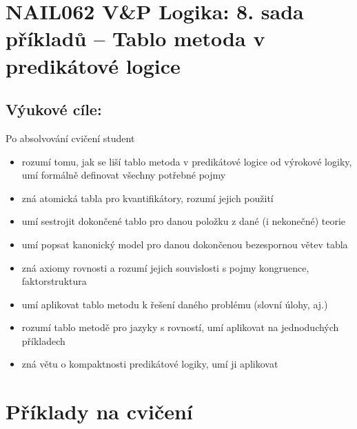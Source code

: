 \section*{NAIL062 V\&P Logika: 8. sada příkladů -- Tablo metoda v predikátové logice}


\subsection*{Výukové cíle:} Po absolvování cvičení student

    \begin{itemize}\setlength{\itemsep}{0pt}
        \item rozumí tomu, jak se liší tablo metoda v predikátové logice od výrokové logiky, umí formálně definovat všechny potřebné pojmy
        \item zná atomická tabla pro kvantifikátory, rozumí jejich použití
        \item umí sestrojit dokončené tablo pro danou položku z dané (i nekonečné) teorie
        \item umí popsat kanonický model pro danou dokončenou bezespornou větev tabla
        \item zná axiomy rovnosti a rozumí jejich souvislosti s pojmy kongruence, faktorstruktura
        \item umí aplikovat tablo metodu k řešení daného problému (slovní úlohy, aj.)
        \item rozumí tablo metodě pro jazyky s rovností, umí aplikovat na jednoduchých příkladech
        \item zná větu o kompaktnosti predikátové logiky, umí ji aplikovat
    \end{itemize}
    

\section*{Příklady na cvičení}
        
